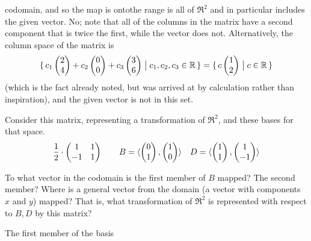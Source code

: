 \begin{exercises}
\begin{answer}
\begin{exparts}
         codomain, and so the map is onto\Dash the range is all of $\Re^2$ and
         in particular includes the given vector.
       \partsitem No; note that all of the columns in the matrix have a second
         component that is twice the first, while the vector does not.
         Alternatively, the column space of the matrix is 
         \begin{equation*}
           \mbox{$\{\,c_1\begin{pmatrix} 2 \\ 4 \end{pmatrix}
                +c_2\begin{pmatrix} 0 \\ 0 \end{pmatrix}
                +c_3\begin{pmatrix} 3 \\ 6 \end{pmatrix} \bigm| c_1,c_2,c_3\in\mathbb{R}\,\}$}
           =\mbox{$\{\,c\begin{pmatrix} 1 \\ 2 \end{pmatrix}\bigm| c\in\mathbb{R}\,\}$}
         \end{equation*}
         (which is the fact already noted, but was arrived at by calculation 
         rather than inspiration), and the given vector is not in this set.
     \end{exparts}  
    \end{answer}
  \recommended \item  
    Consider this matrix, representing a transformation of $\Re^2$, 
    and these bases for that space.
    \begin{equation*}
      \frac{1}{2}\cdot
      \begin{pmatrix}
        1  &1  \\
        -1 &1
      \end{pmatrix}
      \qquad
      B=\langle\begin{pmatrix} 0 \\ 1 \end{pmatrix},\begin{pmatrix} 1 \\ 0 \end{pmatrix}\rangle
      \quad 
      D=\langle\begin{pmatrix} 1 \\ 1 \end{pmatrix},\begin{pmatrix} 1 \\ -1 \end{pmatrix}\rangle
    \end{equation*}
    \begin{exparts}
      \partsitem To what vector in the codomain 
        is the first member of $B$ mapped? 
      \partsitem The second member?
      \partsitem Where is a general vector from the domain (a vector with 
        components $x$ and $y$) mapped? 
        That is, what transformation of \( \Re^2 \) is represented with 
        respect to \( B,D \) by this matrix?
    \end{exparts}
    \begin{answer}
      \begin{exparts}
        \partsitem The first member of the basis
          \begin{equation*}

\end{equation*}
\end{exparts}
\end{answer}
\end{exercises}
